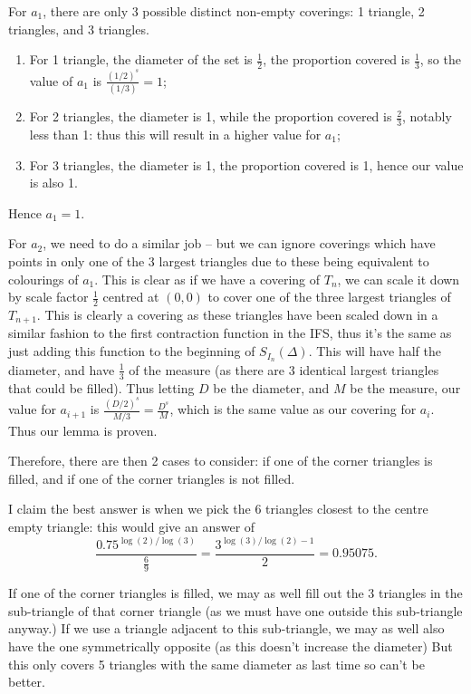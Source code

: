 For \(a_1\), there are only 3 possible distinct non-empty coverings: 1 triangle, 2 triangles, and 3 triangles. 

\begin{enumerate}
    \item For 1 triangle, the diameter of the set is \(\frac{1}{2}\), the proportion covered is \(\frac{1}{3}\), so the value of \(a_1\) is \(\frac{(1/2)^s}{(1/3)} = 1\);
    \item For 2 triangles, the diameter is 1, while the proportion covered is \(\frac{2}{3}\), notably less than 1: thus this will result in a higher value for \(a_1\);
    \item For 3 triangles, the diameter is 1, the proportion covered is 1, hence our value is also 1.
\end{enumerate}

Hence \(a_1 = 1\).

For \(a_2\), we need to do a similar job -- but we can ignore coverings which have points in only one of the 3 largest triangles due to these being equivalent to colourings of \(a_1\). This is clear as if we have a covering of \(T_n\), we can scale it down by scale factor \(\frac{1}{2}\) centred at \((0,0)\) to cover one of the three largest triangles of \(T_{n+1}\). This is clearly a covering as these triangles have been scaled down in a similar fashion to the first contraction function in the IFS, thus it's the same as just adding this function to the beginning of \(S_{I_n}(\Delta)\). This will have half the diameter, and have \(\frac{1}{3}\) of the measure (as there are 3 identical largest triangles that could be filled). Thus letting \(D\) be the diameter, and \(M\) be the measure, our value for \(a_{i+1}\) is \(\frac{(D/2)^s}{M/3} = \frac{D^s}{M}\), which is the same value as our covering for \(a_i\). Thus our lemma is proven. 

Therefore, there are then 2 cases to consider: if one of the corner triangles is filled, and if one of the corner triangles is not filled. 

I claim the best answer is when we pick the 6 triangles closest to the centre empty triangle: this would give an answer of
\[\frac{0.75^{\log(2)/\log(3)}}{\frac{6}{9}} = \frac{3^{\log(3)/\log(2) - 1}}{2} = 0.95075.\]

If one of the corner triangles is filled, we may as well fill out the 3 triangles in the sub-triangle of that corner triangle (as we must have one outside this sub-triangle anyway.) If we use a triangle adjacent to this sub-triangle, we may as well also have the one symmetrically opposite (as this doesn't increase the diameter) But this only covers 5 triangles with the same diameter as last time so can't be better.

